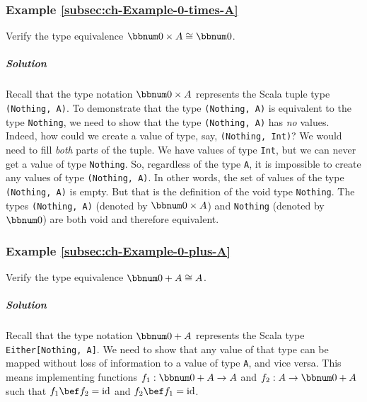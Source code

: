 \subsubsection{Example \label{subsec:ch-Example-0-times-A}\ref{subsec:ch-Example-0-times-A}}

Verify the type equivalence $\bbnum 0\times A\cong\bbnum 0$.

\subparagraph{Solution}

Recall that the type notation $\bbnum 0\times A$ represents the Scala
tuple type \lstinline!(Nothing, A)!. To demonstrate that the type
\lstinline!(Nothing, A)! is equivalent to the type \lstinline!Nothing!,
we need to show that the type \lstinline!(Nothing, A)! has \emph{no}
values. Indeed, how could we create a value of type, say, \lstinline!(Nothing, Int)!?
We would need to fill \emph{both} parts of the tuple. We have values
of type \lstinline!Int!, but we can never get a value of type \lstinline!Nothing!.
So, regardless of the type \lstinline!A!, it is impossible to create
any values of type \lstinline!(Nothing, A)!. In other words, the
set of values of the type \lstinline!(Nothing, A)! is empty. But
that is the definition of the void type \lstinline!Nothing!. The
types \lstinline!(Nothing, A)! (denoted by $\bbnum 0\times A$) and
\lstinline!Nothing! (denoted by $\bbnum 0$) are both void and therefore
equivalent.

\subsubsection{Example \label{subsec:ch-Example-0-plus-A}\ref{subsec:ch-Example-0-plus-A}}

Verify the type equivalence $\bbnum 0+A\cong A$.

\subparagraph{Solution}

Recall that the type notation $\bbnum 0+A$ represents the Scala type
\lstinline!Either[Nothing, A]!. We need to show that any value of
that type can be mapped without loss of information to a value of
type \lstinline!A!, and vice versa. This means implementing functions
$f_{1}:\bbnum 0+A\rightarrow A$ and $f_{2}:A\rightarrow\bbnum 0+A$
such that $f_{1}\bef f_{2}=\text{id}$ and $f_{2}\bef f_{1}=\text{id}$.


